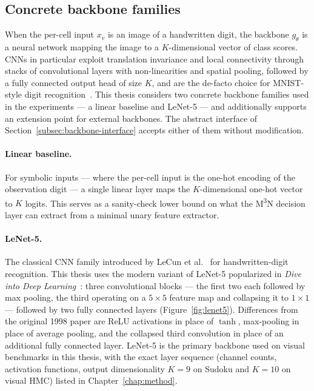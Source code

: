 \subsection{Concrete backbone families}

When the per-cell input $x_v$ is an image of a handwritten digit,
the backbone $g_\theta$ is a neural network mapping the image to
a $K$-dimensional vector of class scores. CNNs in particular
exploit translation invariance and local connectivity through
stacks of convolutional layers with non-linearities and spatial
pooling, followed by a fully connected output head of size $K$,
and are the de-facto choice for MNIST-style digit
recognition~\cite{LeCun1998}. This thesis considers two
concrete backbone families used in the experiments --- a linear
baseline and LeNet-5 --- and additionally supports an extension
point for external backbones. The abstract interface of
Section~\ref{subsec:backbone-interface} accepts either of them
without modification.

\paragraph{Linear baseline.} For symbolic inputs --- where the
per-cell input is the one-hot encoding of the observation digit
--- a single linear layer maps the $K$-dimensional one-hot vector
to $K$ logits. This serves as a sanity-check lower bound on what
the M\textsuperscript{3}N decision layer can extract from a
minimal unary feature extractor.

\paragraph{LeNet-5.} The classical CNN family introduced by LeCun
et al.~\cite{LeCun1998} for handwritten-digit recognition. This
thesis uses the modern variant of LeNet-5 popularized in
\emph{Dive into Deep Learning}~\cite{d2l-lenet}: three
convolutional blocks --- the first two each followed by max
pooling, the third operating on a $5 \times 5$ feature map and
collapsing it to $1 \times 1$ --- followed by two fully connected
layers (Figure~\ref{fig:lenet5}). Differences from the original
1998 paper are ReLU activations in place of $\tanh$, max-pooling
in place of average pooling, and the collapsed third convolution
in place of an additional fully connected layer. LeNet-5 is the
primary backbone used on visual benchmarks in this thesis, with
the exact layer sequence (channel counts, activation functions,
output dimensionality $K = 9$ on Sudoku and $K = 10$ on visual
HMC) listed in Chapter~\ref{chap:method}.

